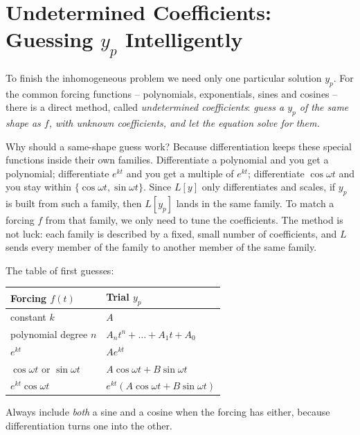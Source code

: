 \section{Undetermined Coefficients: Guessing \texorpdfstring{$y_p$}{y\_p} Intelligently}
\label{ch38:undetermined}

To finish the inhomogeneous problem we need only one particular solution $y_p$.
For the common forcing functions -- polynomials, exponentials, sines and
cosines -- there is a direct method, called \emph{undetermined coefficients}:
\emph{guess a $y_p$ of the same
shape as $f$, with unknown coefficients, and let the equation solve for them.}

\begin{whybox}
Why should a same-shape guess work? Because differentiation keeps these special
functions inside their own families. Differentiate a polynomial and you get a
polynomial; differentiate $e^{kt}$ and you get a multiple of $e^{kt}$;
differentiate $\cos\omega t$ and you stay within $\{\cos\omega t,
\sin\omega t\}$. Since $L[y]$ only differentiates and scales, if $y_p$ is built
from such a family, then $L[y_p]$ lands in the same family. To match a forcing
$f$ from that family, we only need to tune the coefficients. The method is not
luck: each family is described by a fixed, small number of coefficients, and $L$
sends every member of the family to another member of the same family.
\end{whybox}

The table of first guesses:
\begin{center}
\begin{tabular}{ll}
\toprule
Forcing $f(t)$ & Trial $y_p$ \\
\midrule
constant $k$ & $A$ \\
polynomial degree $n$ & $A_n t^n + \dots + A_1 t + A_0$ \\
$e^{kt}$ & $A e^{kt}$ \\
$\cos\omega t$ or $\sin\omega t$ & $A\cos\omega t + B\sin\omega t$ \\
$e^{kt}\cos\omega t$ & $e^{kt}(A\cos\omega t + B\sin\omega t)$ \\
\bottomrule
\end{tabular}
\end{center}
Always include \emph{both} a sine and a cosine when the forcing has either,
because differentiation turns one into the other.

